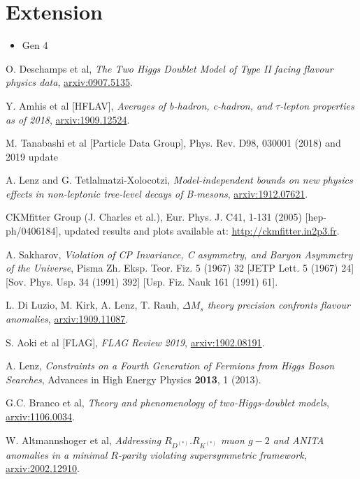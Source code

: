 \documentclass[12pt,a4paper]{article}
\renewcommand{\emph}{\textit}
\begin{document}
\section{Extension}
\begin{itemize}
    \item Gen 4
\end{itemize}

\newpage
\begin{thebibliography}{99}
O. Deschamps et al, \emph{The Two Higgs Doublet Model of Type II facing flavour physics data}, \href{https://arxiv.org/pdf/0907.5135.pdf}{arxiv:0907.5135}.

Y. Amhis et al [HFLAV], \emph{Averages of b-hadron, c-hadron, and $\tau$-lepton properties as of 2018}, \href{https://arxiv.org/pdf/1909.12524.pdf}{arxiv:1909.12524}.

M. Tanabashi et al [Particle Data Group], Phys. Rev. D98, 030001 (2018) and 2019 update

A. Lenz and G. Tetlalmatzi-Xolocotzi, \emph{Model-independent bounds on new physics effects in non-leptonic tree-level decays of B-mesons}, \href{https://arxiv.org/pdf/1912.07621.pdf}{arxiv:1912.07621}.

CKMfitter Group (J. Charles et al.), Eur. Phys. J. C41, 1-131 (2005) [hep-ph/0406184], updated results and plots available at: \href{http://ckmfitter.in2p3.fr}{http://ckmfitter.in2p3.fr}.

A. Sakharov, \emph{Violation of CP Invariance, C asymmetry, and Baryon Asymmetry of the Universe}, Pisma Zh. Eksp. Teor. Fiz. 5 (1967) 32 [JETP Lett. 5 (1967) 24] [Sov. Phys. Usp. 34 (1991) 392] [Usp. Fiz. Nauk 161 (1991) 61].

L. Di Luzio, M. Kirk, A. Lenz, T. Rauh, \emph{$\Delta M_s$ theory precision confronts flavour anomalies}, \href{https://arxiv.org/pdf/1909.11087.pdf}{arxiv:1909.11087}.

S. Aoki et al [FLAG], \emph{FLAG Review 2019}, \href{https://arxiv.org/pdf/1902.08191.pdf}{arxiv:1902.08191}.

A. Lenz, \emph{Constraints on a Fourth Generation of Fermions from Higgs Boson Searches}, Advances in High Energy Physics \textbf{2013}, 1 (2013).

G.C. Branco et al, \emph{Theory and phenomenology of two-Higgs-doublet models}, \href{https://arxiv.org/pdf/1106.0034.pdf}{arxiv:1106.0034}.

W. Altmannshoger et al, \emph{Addressing $R_{D^{(*)}}. R_{K^{(*)}}$ muon $g-2$ and ANITA anomalies in a minimal $R$-parity violating supersymmetric framework}, \href{https://arxiv.org/pdf/2002.12910.pdf}{arxiv:2002.12910}.
\end{thebibliography}
\end{document}
